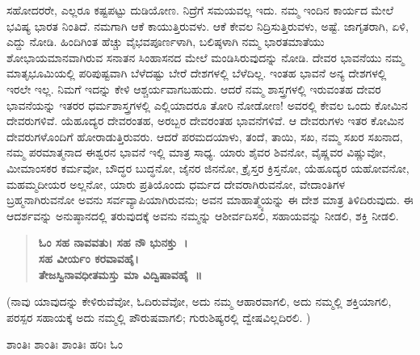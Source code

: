 ಸಹೋದರರೇ, ಎಲ್ಲರೂ ಕಷ್ಟಪಟ್ಟು ದುಡಿಯೋಣ. ನಿದ್ರೆಗೆ ಸಮಯವಲ್ಲ ಇದು. ನಮ್ಮ ಇಂದಿನ ಕಾರ್ಯದ ಮೇಲೆ ಭವಿಷ್ಯ ಭಾರತ ನಿಂತಿದೆ. ನಮಗಾಗಿ ಆಕೆ ಕಾಯುತ್ತಿರುವಳು. ಆಕೆ ಕೇವಲ ನಿದ್ರಿಸುತ್ತಿರುವಳು, ಅಷ್ಟೆ. ಜಾಗೃತರಾಗಿ, ಏಳಿ, ಎದ್ದು ನೋಡಿ. ಹಿಂದಿಗಿಂತ ಹೆಚ್ಚು ವೈಭವಪೂರ್ಣಳಾಗಿ, ಬಲಿಷ್ಠಳಾಗಿ ನಮ್ಮ ಭಾರತಮಾತೆಯು ಶೋಭಾಯಮಾನವಾಗಿರುವ ಸನಾತನ ಸಿಂಹಾಸನದ ಮೇಲೆ ಮಂಡಿಸಿರುವುದನ್ನು ನೋಡಿ. ದೇವರ ಭಾವನೆಯು ನಮ್ಮ ಮಾತೃಭೂಮಿಯಲ್ಲಿ ಪರಿಪುಷ್ಟವಾಗಿ ಬೆಳೆದಷ್ಟು ಬೇರೆ ದೇಶಗಳಲ್ಲಿ ಬೆಳೆದಿಲ್ಲ. ಇಂತಹ ಭಾವನೆ ಅನ್ಯ ದೇಶಗಳಲ್ಲಿ ಇರಲೇ ಇಲ್ಲ. ನಿಮಗೆ ಇದನ್ನು ಕೇಳಿ ಆಶ್ಚರ್ಯವಾಗಬಹುದು. ಆದರೆ ನಮ್ಮ ಶಾಸ್ತ್ರಗಳಲ್ಲಿ ಇರುವಂತಹ ದೇವರ ಭಾವನೆಯನ್ನು ಇತರರ ಧರ್ಮಶಾಸ್ತ್ರಗಳಲ್ಲಿ ಎಲ್ಲಿಯಾದರೂ ತೋರಿ ನೋಡೋಣ! ಅವರಲ್ಲಿ ಕೇವಲ ಒಂದು ಕೋಮಿನ ದೇವರುಗಳಿವೆ. ಯೆಹೂದ್ಯರ ದೇವರಂತಹ, ಅರಬ್ಬರ ದೇವರಂತಹ ಭಾವನೆಗಳಿವೆ. ಆ ದೇವರುಗಳು ಇತರ ಕೋಮಿನ ದೇವರುಗಳೊಂದಿಗೆ ಹೋರಾಡುತ್ತಿರುವರು. ಆದರೆ ಪರಮದಯಾಳು, ತಂದೆ, ತಾಯಿ, ಸಖ, ನಮ್ಮ ಸಖರ ಸಖನಾದ, ನಮ್ಮ ಪರಮಾತ್ಮನಾದ ಈಶ್ವರನ ಭಾವನೆ ಇಲ್ಲಿ ಮಾತ್ರ ಸಾಧ್ಯ. ಯಾರು ಶೈವರ ಶಿವನೋ, ವೈಷ್ಣವರ ವಿಷ್ಣುವೋ, ಮೀಮಾಂಸಕರ ಕರ್ಮವೋ, ಬೌದ್ಧರ ಬುದ್ಧನೋ, ಜೈನರ ಜಿನನೋ, ಕ್ರೈಸ್ತರ ಕ್ರಿಸ್ತನೋ, ಯೆಹೂದ್ಯರ ಯಹೋವನೋ, ಮಹಮ್ಮದೀಯರ ಅಲ್ಲನೋ, ಯಾರು ಪ್ರತಿಯೊಂದು ಧರ್ಮದ ದೇವರಾಗಿರುವನೋ, ವೇದಾಂತಿಗಳ ಬ್ರಹ್ಮನಾಗಿರುವನೋ ಅವನು ಸರ್ವವ್ಯಾಪಿಯಾಗಿರುವನು; ಅವನ ಮಾಹಾತ್ಮ್ಯೆಯನ್ನು ಈ ದೇಶ ಮಾತ್ರ ತಿಳಿದಿರುವುದು. ಈ ಆದರ್ಶವನ್ನು ಅನುಷ್ಠಾನದಲ್ಲಿ ತರುವುದಕ್ಕೆ ಅವನು ನಮ್ಮನ್ನು ಆಶೀರ್ವದಿಸಲಿ, ಸಹಾಯವನ್ನು ನೀಡಲಿ, ಶಕ್ತಿ ನೀಡಲಿ. 

\newpage

\begin{verse}
\textbf{ಓಂ ಸಹ ನಾವವತು। ಸಹ ನೌ ಭುನಕ್ತು~।\\ ಸಹ ವೀರ್ಯಂ ಕರವಾವಹೈ।}\\\textbf{ತೇಜಸ್ವಿನಾವಧೀತಮಸ್ತು ಮಾ ವಿದ್ವಿಷಾವಹೈ~॥} 
\end{verse}

(ನಾವು ಯಾವುದನ್ನು ಕೇಳಿರುವೆವೋ, ಓದಿರುವೆವೋ, ಅದು ನಮ್ಮ ಆಹಾರವಾಗಲಿ, ಅದು ನಮ್ಮಲ್ಲಿ ಶಕ್ತಿಯಾಗಲಿ, ಪರಸ್ಪರ ಸಹಾಯಕ್ಕೆ ಅದು ನಮ್ಮಲ್ಲಿ ಪೌರುಷವಾಗಲಿ; ಗುರುಶಿಷ್ಯರಲ್ಲಿ ದ್ವೇಷವಿಲ್ಲದಿರಲಿ. )

\begin{center}
ಶಾಂತಿಃ ಶಾಂತಿಃ ಶಾಂತಿಃ ಹರಿಃ ಓಂ
\end{center}

